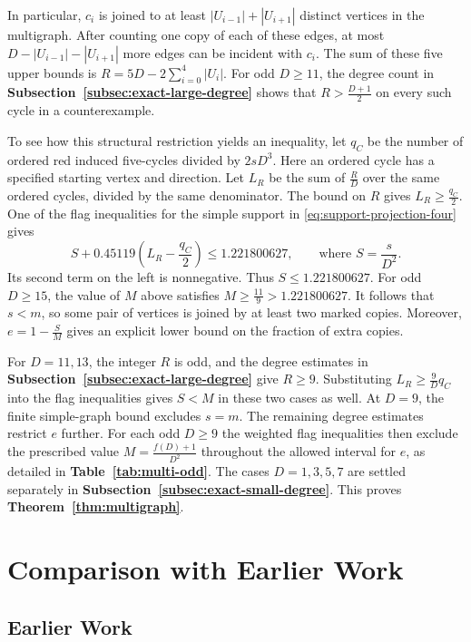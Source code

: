 \documentclass[preprint,11pt,numbers]{elsarticle-arxiv}
\numberwithin{equation}{section}
\theoremstyle{definition}
\begin{document}
In particular, $c_i$ is joined to at least $|U_{i-1}|+|U_{i+1}|$
distinct vertices in the multigraph. After counting one copy of each
of these edges, at most $D-|U_{i-1}|-|U_{i+1}|$ more edges can be
incident with $c_i$. The sum of these five upper bounds is
$R=5D-2\sum_{i=0}^4|U_i|$. For odd $D\geq11$, the degree count in
\textbf{Subsection~\ref{subsec:exact-large-degree}} shows that $R>\frac{D+1}{2}$ on
every such cycle in a counterexample.

To see how this structural restriction yields an inequality, let
$q_C$ be the number of ordered red induced five-cycles divided by
$2sD^3$. Here an ordered cycle has a specified starting vertex and
direction. Let $L_R$ be the sum of $\frac{R}{D}$ over the same
ordered cycles, divided by the same denominator. The bound on $R$
gives $L_R\geq\frac{q_C}{2}$. One of the flag inequalities for the
simple support in \eqref{eq:support-projection-four} gives
\[
 S+0.45119\left(L_R-\frac{q_C}{2}\right)\leq 1.221800627,
 \qquad\text{where }S=\frac{s}{D^2}.
\]
Its second term on the left is nonnegative. Thus
$S\leq1.221800627$. For odd $D\geq15$, the value of $M$ above
satisfies $M\geq\frac{11}{9}>1.221800627$. It follows that $s<m$,
so some pair of vertices is joined by at least two marked copies.
Moreover, $e=1-\frac{S}{M}$ gives an explicit lower bound on the
fraction of extra copies.

For $D=11,13$, the integer $R$ is odd, and the degree estimates
in \textbf{Subsection~\ref{subsec:exact-large-degree}} give $R\geq9$. Substituting
$L_R\geq\frac{9}{D}q_C$ into the flag inequalities gives $S<M$
in these two cases as well. At $D=9$, the finite simple-graph
bound excludes $s=m$. The remaining degree estimates restrict $e$
further. For each odd $D\geq9$ the weighted flag inequalities then
exclude the prescribed value $M=\frac{f(D)+1}{D^2}$ throughout the
allowed interval for $e$, as detailed in
\textbf{Table~\ref{tab:multi-odd}}. The cases $D=1,3,5,7$ are
settled separately in \textbf{Subsection~\ref{subsec:exact-small-degree}}. This proves
\textbf{Theorem~\ref{thm:multigraph}}.
\section{Comparison with Earlier Work}\label{sec:earlier-work}

\subsection{Earlier Work}
\end{document}
